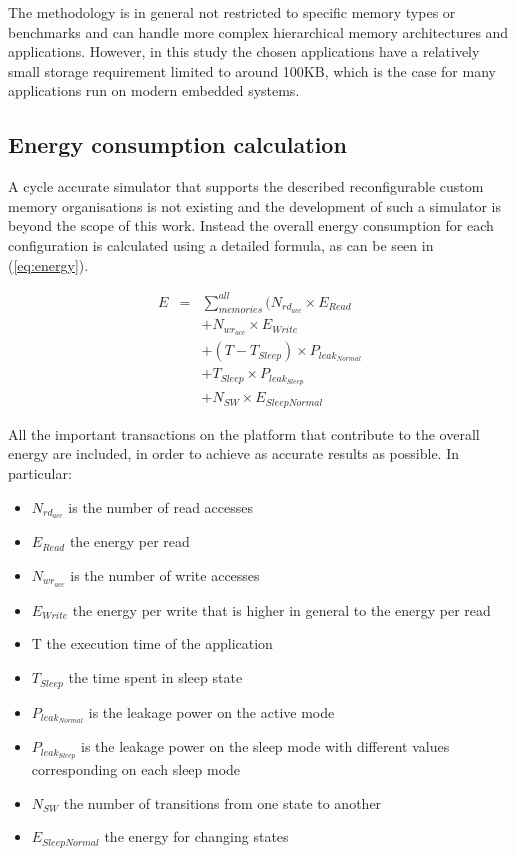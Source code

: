 \documentclass{acm_proc_article-sp}
\begin{document}
The methodology is in general not restricted to specific memory types or benchmarks and can handle more complex hierarchical memory architectures and applications. However, in this study the chosen applications have a relatively small storage requirement limited to around 100KB, which is the case for many applications run on modern embedded systems. 

\subsection{Energy consumption calculation}

A cycle accurate simulator that supports the described reconfigurable custom memory organisations is not existing and the development of such a simulator is beyond the scope of this work.  Instead the overall energy consumption for each configuration is calculated using a detailed formula, as can be seen in (\ref{eq:energy}). 

\setlength{\arraycolsep}{0.0em}
\begin{eqnarray}
\label{eq:energy}
 E &{}= {}&\sum\limits_{memories}^{all}  ( N_{rd_{acc}} \times E_{Read} \nonumber\\
		&&+ N_{wr_{acc}} \times E_{Write} \nonumber\\
		&&+ (T - T_{Sleep}) \times P_{leak_{Normal}} \nonumber\\
		&&+ T_{Sleep} \times P_{leak_{Sleep}} \nonumber\\ 
		&& + N_{SW} \times E_{SleepNormal}
\end{eqnarray}
\setlength{\arraycolsep}{5pt}

All the important transactions on the platform that contribute to the overall energy are included, in order to achieve as accurate results as possible. In particular:
\begin{itemize}
\item $N_{rd_{acc}}$ is the number of read accesses
\item $E_{Read}$ the energy per read
\item $N_{wr_{acc}}$ is the number of write accesses 
\item $E_{Write}$ the energy per write that is higher in general to the energy per read 
\item T the execution time of the application
\item $T_{Sleep}$ the time spent in sleep state
\item $P_{leak_{Normal}}$ is the leakage power on the active mode 
\item $P_{leak_{Sleep}}$ is the leakage power on the sleep mode with different values corresponding on each sleep mode 
\item $N_{SW}$ the number of transitions from one state to another
\item $E_{SleepNormal}$ the energy for changing states
\end{itemize}
\end{document}
